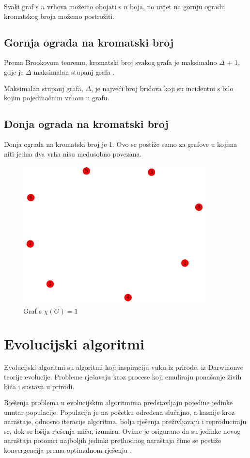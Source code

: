 \documentclass[times, utf8, zavrsni, numeric]{fer}
\begin{document}
Svaki graf s $n$ vrhova možemo obojati s $n$ boja, no uvjet na gornju ogradu kromatskog broja možemo postrožiti.

\section{Gornja ograda na kromatski broj}
Prema Brookovom teoremu, kromatski broj svakog grafa je maksimalno $\Delta$ + 1, gdje je $\Delta$ maksimalan stupanj grafa \cite{cranston2015brooks}. 

Maksimalan stupanj grafa, $\Delta$, je najveći broj bridova koji su incidentni s bilo kojim pojedinačnim vrhom u grafu.

\section{Donja ograda na kromatski broj}
Donja ograda na kromatski broj je 1. Ovo se postiže samo za grafove u kojima niti jedna dva vrha nisu međusobno povezana.

\begin{figure}[htb]
\centering
\includegraphics[width=10cm]{images/8_vertices_nepovezane.png}
\caption{Graf s $\chi(G)=1$}
\label{fig:graf s kromatskim brojem 1}
\end{figure}

\chapter{Evolucijski algoritmi}

Evolucijski algoritmi su algoritmi koji inspiraciju vuku iz prirode, iz Darwinonve teorije evolucije. Probleme rješavaju kroz procese koji emuliraju ponašanje živih bića i sustava u prirodi.

Rješenja problema u evolucijskim algoritmima predstavljaju pojedine jedinke unutar populacije. Populacija je na početku određena slučajno, a kasnije kroz naraštaje, odnosno iteracije algoritma, bolja rješenja preživljavaju i reproduciraju se, dok se lošija rješenja miču, izumiru. Ovime je osigurano da su jedinke novog naraštaja potomci najboljih jedinki prethodnog naraštaja čime se postiže konvergencija prema optimalnom rješenju \cite{cupic2010prirodom}.
\end{document}

